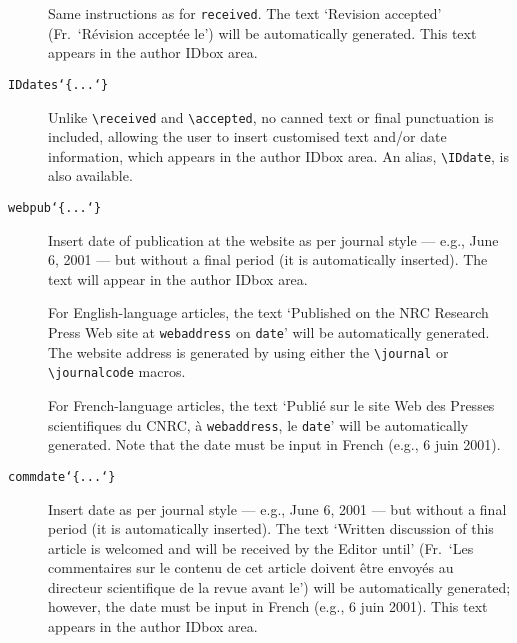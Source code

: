 \begin{description}
         Same instructions as for \texttt{\blash received}. The text
         `Revision accepted' (Fr.\ `R\'evision accept\'ee le') will be
         automatically generated. This text appears in the author
         IDbox area.


   \item [{\tt \blash IDdates\char`\{...\char`\}}] \mbox{}

         Unlike \verb|\received| and \verb|\accepted|, no canned text or
         final punctuation is included, allowing the user to insert 
         customised text and/or date information, which appears in the
         author IDbox area.  An alias, \verb|\IDdate|, is also
         available.


   \item [{\tt \blash webpub\char`\{...\char`\}}] \mbox{}

         Insert date of publication at the \NRC{} website as per
         journal style --- e.g., June 6, 2001 --- but without a final
         period (it is automatically inserted). The text will appear
         in the author IDbox area. 

         For English-language articles, the text `Published on the
         {\small NRC} Research Press Web site at \verb|webaddress| on
         \verb|date|' will be automatically generated. The website
         address is generated by using either the \verb|\journal| or
         \verb|\journalcode| macros.

         For French-language articles, the text `Publi\'{e} sur le
         site Web des Presses scientifiques du {\small CNRC}, \`a
         \verb|webaddress|, le \verb|date|' will be automatically
         generated. Note that the date must be input in French (e.g.,
         6 juin 2001).


   \item [{\tt \blash commdate\char`\{...\char`\}}] \mbox{}

         Insert date as per journal style --- e.g., June 6, 2001 ---
         but without a final period (it is automatically inserted).
         The text `Written discussion of this article is welcomed and
         will be received by the Editor until' (Fr.\ `Les commentaires
         sur le contenu de cet article doivent \^{e}tre envoy\'{e}s au
         directeur scientifique de la revue avant le') will be
         automatically generated; however, the date must be input in
         French (e.g., 6 juin 2001). This text appears in the author
         IDbox area.  



\end{description}
